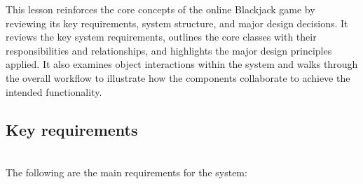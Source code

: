 

This lesson reinforces the core concepts of the online Blackjack game by reviewing its key requirements, system structure, and major design decisions. It reviews the key system requirements, outlines the core classes with their responsibilities and relationships, and highlights the major design principles applied. It also examines object interactions within the system and walks through the overall workflow to illustrate how the components collaborate to achieve the intended functionality.

\subsection{Key requirements}\label{EK9w-eG7VSPiEUqQeEd2p}
\\
The following are the main requirements for the system:

